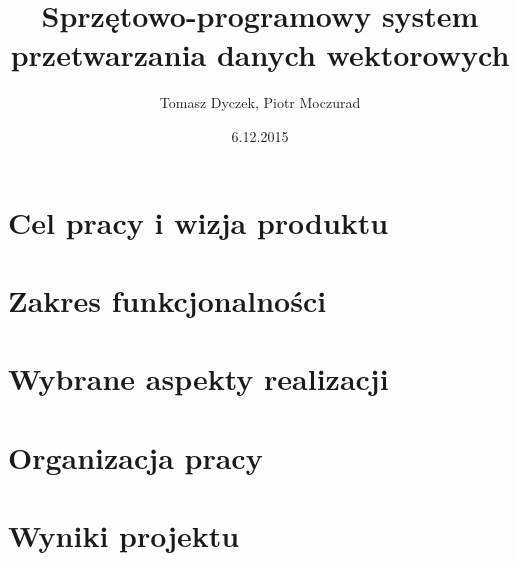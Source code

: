\documentclass[12pt,twoside]{report}
\title{Sprzętowo-programowy system przetwarzania danych wektorowych}
\author{Tomasz Dyczek, Piotr Moczurad}
\date{6.12.2015}
\begin{document}
	
	\tableofcontents
	
	\chapter{Cel pracy i wizja produktu}
    

    \chapter{Zakres funkcjonalności}
    

    \chapter{Wybrane aspekty realizacji}
    

    \chapter{Organizacja pracy}
    

    \chapter{Wyniki projektu}
    

    
	
\end{document}
